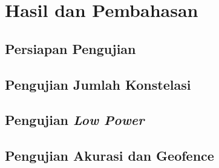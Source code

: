 \chapter{Hasil dan Pembahasan}

\section{Persiapan Pengujian}

\section{Pengujian Jumlah Konstelasi}

\section{Pengujian \textit{Low Power}}

\section{Pengujian Akurasi dan Geofence}